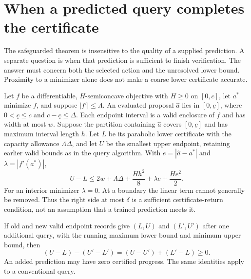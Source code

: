\section{When a predicted query completes the certificate}\label{sec:localization65}
The safeguarded theorem is insensitive to the quality of a supplied prediction. A separate question is when that prediction is sufficient to finish verification. The answer must concern both the selected action and the unresolved lower bound. Proximity to a minimizer alone does not make a coarse lower certificate accurate.

\begin{proposition}\label{prop:localization65}
Let $f$ be a differentiable, $H$-semiconcave objective with $H\ge0$ on $[0,c]$, let $a^*$ minimize $f$, and suppose $|f'|\le\Lambda$. An evaluated proposal $\widehat a$ lies in $[0,\underline c]$, where $0<\underline c\le c$ and $c-\underline c\le\Delta$. Each endpoint interval is a valid enclosure of $f$ and has width at most $w$. Suppose the partition containing $\widehat a$ covers $[0,\underline c]$ and has maximum interval length $h$. Let $L$ be its parabolic lower certificate with the capacity allowance $\Lambda\Delta$, and let $U$ be the smallest upper endpoint, retaining earlier valid bounds as in the query algorithm. With $e=|\widehat a-a^*|$ and $\lambda=|f'(a^*)|$,
\begin{equation}\label{eq:localization65}
 U-L\le 2w+\Lambda\Delta+\frac{Hh^2}{8}
                         +\lambda e+\frac{He^2}{2}.
\end{equation}
For an interior minimizer $\lambda=0$. At a boundary the linear term cannot generally be removed. Thus the right side at most $\delta$ is a sufficient certificate-return condition, not an assumption that a trained prediction meets it.

If old and new valid endpoint records give $(L,U)$ and $(L',U')$ after one additional query, with the running maximum lower bound and minimum upper bound, then
\begin{equation}\label{eq:certificate-progress65}
 (U-L)-(U'-L')=(U-U')+(L'-L)\ge0.
\end{equation}
An added prediction may have zero certified progress. The same identities apply to a conventional query.
\end{proposition}
